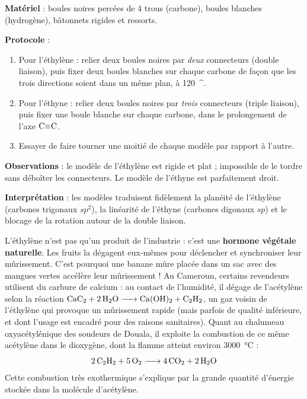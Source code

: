 \documentclass[11pt]{article}
\providecommand{\degree}{^{\circ}}
\newcommand{\cle}[1]{{\popxbold\color{popdark}#1}}
\begin{document}
\begin{experience}
\textbf{Matériel} : boules noires percées de 4 trous (carbone), boules blanches (hydrogène), bâtonnets rigides et ressorts.

\textbf{Protocole} :
\begin{enumerate}
\item Pour l'éthylène : relier deux boules noires par \emph{deux} connecteurs (double liaison), puis fixer deux boules blanches sur chaque carbone de façon que les trois directions soient dans un même plan, à \SI{120}{\degree}.
\item Pour l'éthyne : relier deux boules noires par \emph{trois} connecteurs (triple liaison), puis fixer une boule blanche sur chaque carbone, dans le prolongement de l'axe $\ce{C\bond{3}C}$.
\item Essayer de faire tourner une moitié de chaque modèle par rapport à l'autre.
\end{enumerate}

\textbf{Observations} : le modèle de l'éthylène est rigide et plat ; impossible de le tordre sans déboîter les connecteurs. Le modèle de l'éthyne est parfaitement droit.

\textbf{Interprétation} : les modèles traduisent fidèlement la planéité de l'éthylène (carbones trigonaux $sp^2$), la linéarité de l'éthyne (carbones digonaux $sp$) et le blocage de la rotation autour de la double liaison.
\end{experience}

\begin{savaistu}
L'éthylène  n'est pas qu'un produit de l'industrie : c'est une \textbf{hormone végétale naturelle}. Les fruits la dégagent eux-mêmes pour déclencher et synchroniser leur mûrissement. C'est pourquoi une banane mûre placée dans un sac avec des mangues vertes accélère leur mûrissement ! Au Cameroun, certains revendeurs utilisent du \cle{carbure de calcium}  : au contact de l'humidité, il dégage de l'acétylène  selon la réaction $\ce{CaC2 + 2H2O -> Ca(OH)2 + C2H2}$, un gaz voisin de l'éthylène qui provoque un mûrissement rapide (mais parfois de qualité inférieure, et dont l'usage est encadré pour des raisons sanitaires). Quant au chalumeau oxyacétylénique des soudeurs de Douala, il exploite la combustion de ce même acétylène dans le dioxygène, dont la flamme atteint environ \SI{3000}{\celsius} :
\[ \ce{2C2H2 + 5O2 -> 4CO2 + 2H2O} \]
Cette combustion très exothermique s'explique par la grande quantité d'énergie stockée dans la molécule d'acétylène.
\end{savaistu}
\end{document}

